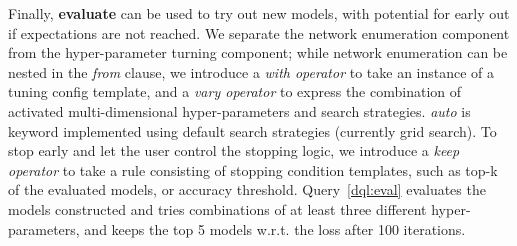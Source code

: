 \documentclass[conference]{IEEEtran}
\begin{document}


Finally, {\bf evaluate} can be used to try out new models, with potential for early out if
expectations are not reached. 
We separate the network enumeration component from the hyper-parameter turning component; 
while network enumeration can be nested in the \emph{from} clause, we introduce a \emph{with operator}
to take an instance of a tuning config template, and a \emph{vary operator} to express the
combination of activated multi-dimensional hyper-parameters and search strategies. \emph{auto} is
keyword implemented using default search strategies (currently grid search). To stop early and let
the user control the stopping logic, we introduce a \emph{keep operator} to take a rule consisting of 
stopping condition templates, such as top-k of the evaluated models, or accuracy threshold.
Query~\ref{dql:eval} evaluates the models constructed and tries combinations of at least three
different hyper-parameters, and keeps the top 5 models w.r.t. the loss after 100 iterations. 


\end{document}
